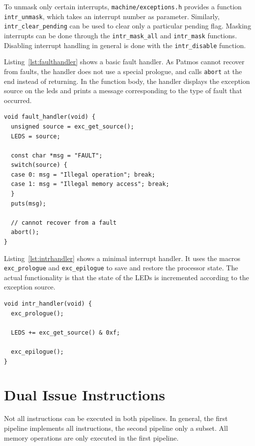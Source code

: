 \documentclass[a4paper,fontsize=10pt,twoside,DIV15,BCOR12mm,headinclude=true,footinclude=false,pagesize,bibtotoc]{scrbook}
\begin{document}
To unmask only certain interrupts, \texttt{machine/exceptions.h}
provides a function \texttt{intr\_unmask}, which takes an interrupt
number as parameter. Similarly, \texttt{intr\_clear\_pending} can be
used to clear only a particular pending flag. Masking interrupts can
be done through the \texttt{intr\_mask\_all} and \texttt{intr\_mask}
functions. Disabling interrupt handling in general is done with the
\texttt{intr\_disable} function.

Listing~\ref{lst:faulthandler} shows a basic fault handler. As Patmos
cannot recover from faults, the handler does not use a special
prologue, and calls \texttt{abort} at the end instead of returning. In
the function body, the handler displays the exception source on the
leds and prints a message corresponding to the type of fault that
occurred.

\begin{lstlisting}[float, caption={Fault handler example\label{lst:faulthandler}}]
void fault_handler(void) {
  unsigned source = exc_get_source();
  LEDS = source;

  const char *msg = "FAULT";
  switch(source) {
  case 0: msg = "Illegal operation"; break;
  case 1: msg = "Illegal memory access"; break;
  }
  puts(msg);

  // cannot recover from a fault
  abort();
}
\end{lstlisting}

Listing~\ref{lst:intrhandler} shows a minimal interrupt handler. It
uses the macros \texttt{exc\_prologue} and \texttt{exc\_epilogue} to
save and restore the processor state. The actual functionality is that
the state of the LEDs is incremented according to the exception source.

\begin{lstlisting}[float, caption={Interrupt handler example\label{lst:intrhandler}}]
void intr_handler(void) {
  exc_prologue();

  LEDS += exc_get_source() & 0xf;

  exc_epilogue();
}
\end{lstlisting}


\clearpage
\section{Dual Issue Instructions}

Not all instructions can be executed in both pipelines. In general, the first
pipeline implements all instructions, the second pipeline only a subset.
All memory operations are only executed in the first pipeline.
\end{document}
